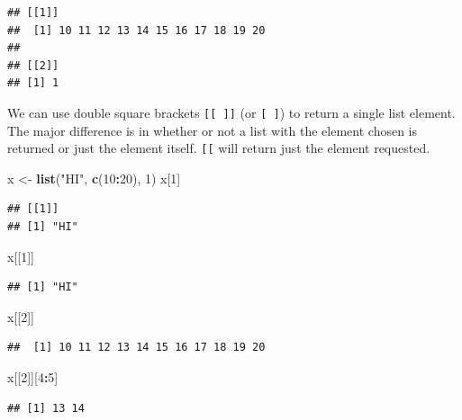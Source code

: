 \documentclass[
]{book}
\newenvironment{Shaded}{\begin{snugshade}}{\end{snugshade}}
\newcommand{\DecValTok}[1]{\textcolor[rgb]{0.00,0.00,0.81}{#1}}
\newcommand{\KeywordTok}[1]{\textcolor[rgb]{0.13,0.29,0.53}{\textbf{#1}}}
\newcommand{\NormalTok}[1]{#1}
\newcommand{\OperatorTok}[1]{\textcolor[rgb]{0.81,0.36,0.00}{\textbf{#1}}}
\newcommand{\StringTok}[1]{\textcolor[rgb]{0.31,0.60,0.02}{#1}}
\theoremstyle{definition}
\theoremstyle{definition}
\theoremstyle{definition}
\theoremstyle{remark}
\begin{document}
\begin{verbatim}
## [[1]]
##  [1] 10 11 12 13 14 15 16 17 18 19 20
## 
## [[2]]
## [1] 1
\end{verbatim}

We can use double square brackets \texttt{{[}{[}\ {]}{]}} (or \texttt{{[}\ {]}}) to return a single list element. The major difference is in whether or not a list with the element chosen is returned or just the element itself. \texttt{{[}{[}} will return just the element requested.

\begin{Shaded}
\begin{Highlighting}[]
\NormalTok{x <-}\StringTok{ }\KeywordTok{list}\NormalTok{(}\StringTok{"HI"}\NormalTok{, }\KeywordTok{c}\NormalTok{(}\DecValTok{10}\OperatorTok{:}\DecValTok{20}\NormalTok{), }\DecValTok{1}\NormalTok{)}
\NormalTok{x[}\DecValTok{1}\NormalTok{]}
\end{Highlighting}
\end{Shaded}

\begin{verbatim}
## [[1]]
## [1] "HI"
\end{verbatim}

\begin{Shaded}
\begin{Highlighting}[]
\NormalTok{x[[}\DecValTok{1}\NormalTok{]]}
\end{Highlighting}
\end{Shaded}

\begin{verbatim}
## [1] "HI"
\end{verbatim}

\begin{Shaded}
\begin{Highlighting}[]
\NormalTok{x[[}\DecValTok{2}\NormalTok{]]}
\end{Highlighting}
\end{Shaded}

\begin{verbatim}
##  [1] 10 11 12 13 14 15 16 17 18 19 20
\end{verbatim}

\begin{Shaded}
\begin{Highlighting}[]
\NormalTok{x[[}\DecValTok{2}\NormalTok{]][}\DecValTok{4}\OperatorTok{:}\DecValTok{5}\NormalTok{]}
\end{Highlighting}
\end{Shaded}

\begin{verbatim}
## [1] 13 14
\end{verbatim}
\end{document}

